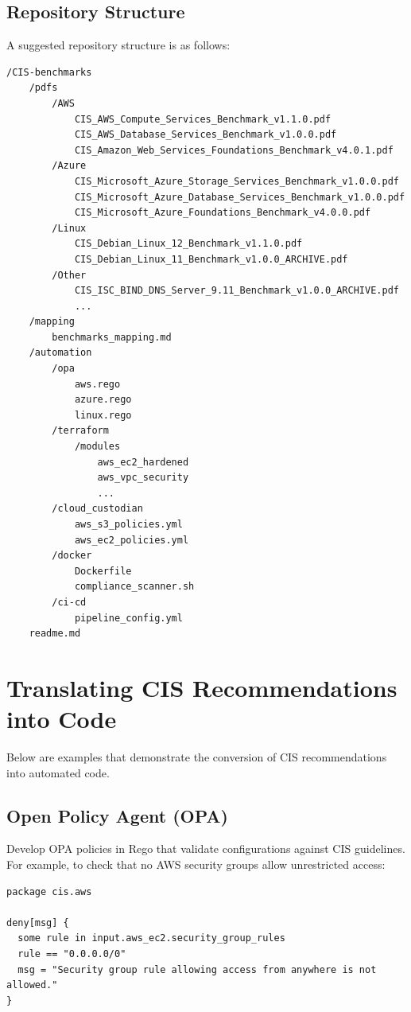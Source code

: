 \documentclass[12pt]{article}
\begin{document}
\subsection{Repository Structure}
A suggested repository structure is as follows:
\begin{verbatim}
/CIS-benchmarks
    /pdfs
        /AWS
            CIS_AWS_Compute_Services_Benchmark_v1.1.0.pdf
            CIS_AWS_Database_Services_Benchmark_v1.0.0.pdf
            CIS_Amazon_Web_Services_Foundations_Benchmark_v4.0.1.pdf
        /Azure
            CIS_Microsoft_Azure_Storage_Services_Benchmark_v1.0.0.pdf
            CIS_Microsoft_Azure_Database_Services_Benchmark_v1.0.0.pdf
            CIS_Microsoft_Azure_Foundations_Benchmark_v4.0.0.pdf
        /Linux
            CIS_Debian_Linux_12_Benchmark_v1.1.0.pdf
            CIS_Debian_Linux_11_Benchmark_v1.0.0_ARCHIVE.pdf
        /Other
            CIS_ISC_BIND_DNS_Server_9.11_Benchmark_v1.0.0_ARCHIVE.pdf
            ...
    /mapping
        benchmarks_mapping.md
    /automation
        /opa
            aws.rego
            azure.rego
            linux.rego
        /terraform
            /modules
                aws_ec2_hardened
                aws_vpc_security
                ...
        /cloud_custodian
            aws_s3_policies.yml
            aws_ec2_policies.yml
        /docker
            Dockerfile
            compliance_scanner.sh
        /ci-cd
            pipeline_config.yml
    readme.md
\end{verbatim}

\section{Translating CIS Recommendations into Code}
Below are examples that demonstrate the conversion of CIS recommendations into automated code.

\subsection{Open Policy Agent (OPA)}
Develop OPA policies in Rego that validate configurations against CIS guidelines. For example, to check that no AWS security groups allow unrestricted access:
\begin{verbatim}
package cis.aws

deny[msg] {
  some rule in input.aws_ec2.security_group_rules
  rule == "0.0.0.0/0"
  msg = "Security group rule allowing access from anywhere is not allowed."
}
\end{verbatim}
\end{document}
